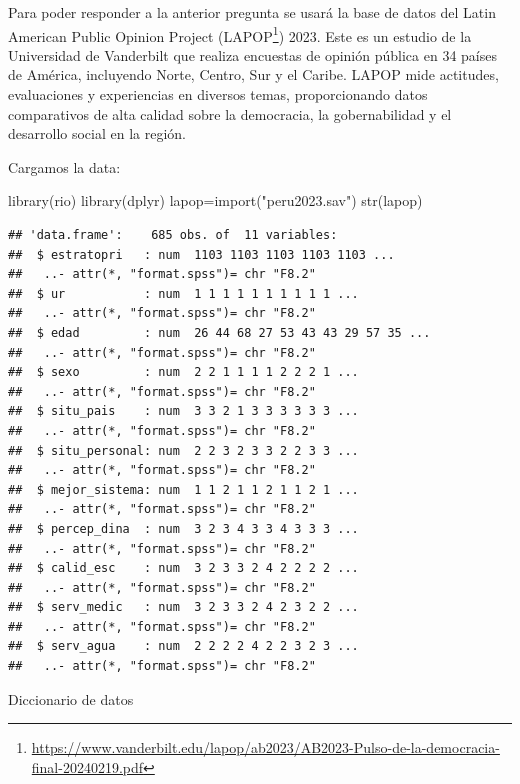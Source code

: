 \documentclass[
]{article}
\newenvironment{Shaded}{\begin{snugshade}}{\end{snugshade}}
\newcommand{\FunctionTok}[1]{\textcolor[rgb]{0.00,0.00,0.00}{#1}}
\newcommand{\NormalTok}[1]{#1}
\newcommand{\OtherTok}[1]{\textcolor[rgb]{0.56,0.35,0.01}{#1}}
\newcommand{\StringTok}[1]{\textcolor[rgb]{0.31,0.60,0.02}{#1}}
\begin{document}
Para poder responder a la anterior pregunta se usará la base de datos
del Latin American Public Opinion Project (LAPOP\footnote{\url{https://www.vanderbilt.edu/lapop/ab2023/AB2023-Pulso-de-la-democracia-final-20240219.pdf}})
2023. Este es un estudio de la Universidad de Vanderbilt que realiza
encuestas de opinión pública en 34 países de América, incluyendo Norte,
Centro, Sur y el Caribe. LAPOP mide actitudes, evaluaciones y
experiencias en diversos temas, proporcionando datos comparativos de
alta calidad sobre la democracia, la gobernabilidad y el desarrollo
social en la región.

Cargamos la data:

\begin{Shaded}
\begin{Highlighting}[]
\FunctionTok{library}\NormalTok{(rio)}
\FunctionTok{library}\NormalTok{(dplyr)}
\NormalTok{lapop}\OtherTok{=}\FunctionTok{import}\NormalTok{(}\StringTok{"peru2023.sav"}\NormalTok{)}
\FunctionTok{str}\NormalTok{(lapop)}
\end{Highlighting}
\end{Shaded}

\begin{verbatim}
## 'data.frame':    685 obs. of  11 variables:
##  $ estratopri   : num  1103 1103 1103 1103 1103 ...
##   ..- attr(*, "format.spss")= chr "F8.2"
##  $ ur           : num  1 1 1 1 1 1 1 1 1 1 ...
##   ..- attr(*, "format.spss")= chr "F8.2"
##  $ edad         : num  26 44 68 27 53 43 43 29 57 35 ...
##   ..- attr(*, "format.spss")= chr "F8.2"
##  $ sexo         : num  2 2 1 1 1 1 2 2 2 1 ...
##   ..- attr(*, "format.spss")= chr "F8.2"
##  $ situ_pais    : num  3 3 2 1 3 3 3 3 3 3 ...
##   ..- attr(*, "format.spss")= chr "F8.2"
##  $ situ_personal: num  2 2 3 2 3 3 2 2 3 3 ...
##   ..- attr(*, "format.spss")= chr "F8.2"
##  $ mejor_sistema: num  1 1 2 1 1 2 1 1 2 1 ...
##   ..- attr(*, "format.spss")= chr "F8.2"
##  $ percep_dina  : num  3 2 3 4 3 3 4 3 3 3 ...
##   ..- attr(*, "format.spss")= chr "F8.2"
##  $ calid_esc    : num  3 2 3 3 2 4 2 2 2 2 ...
##   ..- attr(*, "format.spss")= chr "F8.2"
##  $ serv_medic   : num  3 2 3 3 2 4 2 3 2 2 ...
##   ..- attr(*, "format.spss")= chr "F8.2"
##  $ serv_agua    : num  2 2 2 2 4 2 2 3 2 3 ...
##   ..- attr(*, "format.spss")= chr "F8.2"
\end{verbatim}

Diccionario de datos
\end{document}
